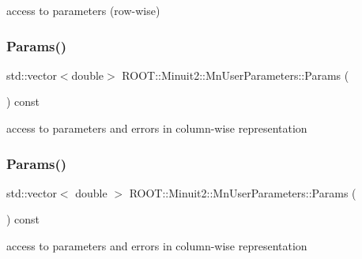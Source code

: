 access to parameters (row-\/wise) 

\mbox{\label{classROOT_1_1Minuit2_1_1MnUserParameters_a68a7baf5aa9548c8dd90142327b27218}} 
\subsubsection{\texorpdfstring{Params()}{Params()}\hspace{0.1cm}{\footnotesize\ttfamily [1/2]}}
{\footnotesize\ttfamily std\+::vector$<$double$>$ R\+O\+O\+T\+::\+Minuit2\+::\+Mn\+User\+Parameters\+::\+Params (\begin{DoxyParamCaption}{ }\end{DoxyParamCaption}) const}



access to parameters and errors in column-\/wise representation 

\mbox{\label{classROOT_1_1Minuit2_1_1MnUserParameters_a0f718b770e7fbeb503f83d8f27ca10f0}} 
\subsubsection{\texorpdfstring{Params()}{Params()}\hspace{0.1cm}{\footnotesize\ttfamily [2/2]}}
{\footnotesize\ttfamily std\+::vector$<$ double $>$ R\+O\+O\+T\+::\+Minuit2\+::\+Mn\+User\+Parameters\+::\+Params (\begin{DoxyParamCaption}{ }\end{DoxyParamCaption}) const}



access to parameters and errors in column-\/wise representation 

